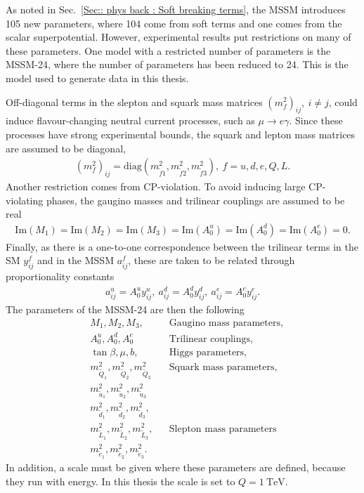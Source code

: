 \documentclass[twoside,english]{uiofysmaster}
\begin{document}
{As noted in Sec.~\ref{Sec:: phys back : Soft breaking terms}, the MSSM introduces 105 new parameters, where 104 come from soft terms and one comes from the scalar superpotential. However, experimental results put restrictions on many of these parameters. One model with a restricted number of parameters is the MSSM-24, where the number of parameters has been reduced to 24. This is the model used to generate data in this thesis. 

Off-diagonal terms in the slepton and squark mass matrices $(m_f^2)_{ij},~i\neq j$, could induce flavour-changing neutral current processes, such as $\mu \rightarrow e \gamma$. Since these processes have strong experimental bounds, the squark and lepton mass matrices are assumed to be diagonal,
\begin{align}
(m_f^2)_{ij} = \text{diag}(m_{\widetilde{f}1}^2, m_{\widetilde{f}2}^2, m_{\widetilde{f}3}^2), ~f = u, d, e, Q, L.
\end{align}
Another restriction comes from CP-violation. To avoid inducing large CP-violating phases, the gaugino masses and trilinear couplings are assumed to be real
\begin{align}
\text{Im}(M_1) = \text{Im}(M_2) = \text{Im} (M_3) = \text{Im} (A_0^u) = \text{Im} (A_0^d) = \text{Im} (A_0^e) = 0.
\end{align}
Finally, as there is a one-to-one correspondence between the trilinear terms in the SM $y_{ij}^f$ and in the MSSM $a^f_{ij}$, these are taken to be related through proportionality constants
\begin{align}
a^u_{ij} = A_0^uy_{ij}^u, ~a^d_{ij} = A_0^dy_{ij}^d, ~a^e_{ij} = A_0^ey_{ij}^e.
\end{align}
 The parameters of the MSSM-24 are then the following
\begin{align}
&M_1, M_2, M_3, && \text{Gaugino mass parameters,} \nonumber \\
&A_0^u, A_0^d, A_0^e && \text{Trilinear couplings,} \nonumber\\
&\tan \beta, \mu, b, && \text{Higgs parameters,} \nonumber\\
& m_{\widetilde{Q}_1}^2, m_{\widetilde{Q}_2}^2, m_{\widetilde{Q}_3}^2 && \text{Squark mass parameters,}\nonumber\\
& m_{\widetilde{u}_1}^2, m_{\widetilde{u}_2}^2, m_{\widetilde{u}_3}^2\nonumber\\
&m_{\widetilde{d}_1}^2, m_{\widetilde{d}_2}^2, m_{\widetilde{d}_3}^2,\nonumber\\
& m_{\widetilde{L}_1}^2, m_{\widetilde{L}_2}^2, m_{\widetilde{L}_3}^2, &&\text{Slepton mass parameters}\nonumber\\
& m_{\widetilde{e}_1}^2, m_{\widetilde{e}_2}^2, m_{\widetilde{e}_3}^2.\nonumber
\end{align}
In addition, a scale must be given where these parameters are defined, because they run with energy. In this thesis the scale is set to $Q=1~\mathrm{TeV}$.

}
\end{document}
